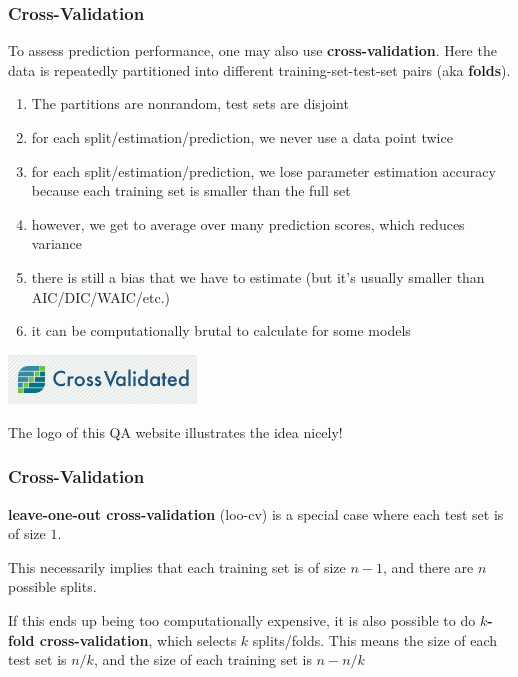 \documentclass{beamer}
\begin{document}
\begin{frame}
\frametitle{Cross-Validation}

To assess prediction performance, one may also use {\bf cross-validation}. Here the data is repeatedly partitioned into different training-set-test-set pairs (aka {\bf folds}).
\pause

\begin{enumerate}
\item The partitions are nonrandom, test sets are disjoint
\item for each split/estimation/prediction, we never use a data point twice
\item for each split/estimation/prediction, we lose parameter estimation accuracy because each training set is smaller than the full set
\item however, we get to average over many prediction scores, which reduces variance
\item there is still a bias that we have to estimate (but it's usually smaller than AIC/DIC/WAIC/etc.)
\item it can be computationally brutal to calculate for some models
\end{enumerate}
\pause

\includegraphics[width=50mm,right]{cv_logo.png}

The logo of this QA website illustrates the idea nicely!
\newline

\end{frame}

\begin{frame}
\frametitle{Cross-Validation}


{\bf leave-one-out cross-validation} (loo-cv) is a special case where each test set is of size $1$.
\newline

This necessarily implies that each training set is of size $n-1$, and there are $n$ possible splits.
\newline

If this ends up being too computationally expensive, it is also possible to do {\bf $k$-fold cross-validation}, which selects $k$ splits/folds. This means the size of each test set is $n/k$, and the size of each training set is $n -n/k$

\end{frame}
\end{document}
